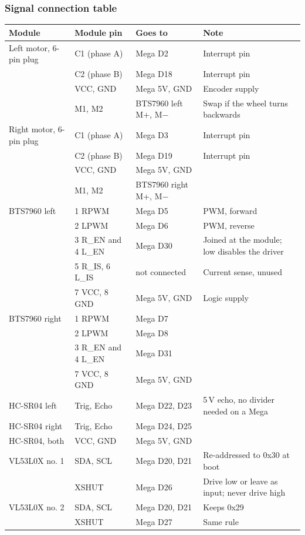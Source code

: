 \subsubsection*{Signal connection table}
{\small
\begin{longtable}{@{}P{37mm}P{27mm}P{38mm}P{50mm}@{}}
\toprule
\textbf{Module} & \textbf{Module pin} & \textbf{Goes to} & \textbf{Note}\\
\midrule\endhead
Left motor, 6-pin plug & C1 (phase A) & Mega D2 & Interrupt pin\\
 & C2 (phase B) & Mega D18 & Interrupt pin\\
 & VCC, GND & Mega 5V, GND & Encoder supply\\
 & M1, M2 & BTS7960 left M+, M$-$ & Swap if the wheel turns backwards\\
Right motor, 6-pin plug & C1 (phase A) & Mega D3 & Interrupt pin\\
 & C2 (phase B) & Mega D19 & Interrupt pin\\
 & VCC, GND & Mega 5V, GND & \\
 & M1, M2 & BTS7960 right M+, M$-$ & \\
BTS7960 left & 1 RPWM & Mega D5 & PWM, forward\\
 & 2 LPWM & Mega D6 & PWM, reverse\\
 & 3 R\_EN and 4 L\_EN & Mega D30 & Joined at the module; low disables the driver\\
 & 5 R\_IS, 6 L\_IS & not connected & Current sense, unused\\
 & 7 VCC, 8 GND & Mega 5V, GND & Logic supply\\
BTS7960 right & 1 RPWM & Mega D7 & \\
 & 2 LPWM & Mega D8 & \\
 & 3 R\_EN and 4 L\_EN & Mega D31 & \\
 & 7 VCC, 8 GND & Mega 5V, GND & \\
HC-SR04 left & Trig, Echo & Mega D22, D23 & 5\,V echo, no divider needed on a Mega\\
HC-SR04 right & Trig, Echo & Mega D24, D25 & \\
HC-SR04, both & VCC, GND & Mega 5V, GND & \\
VL53L0X no. 1 & SDA, SCL & Mega D20, D21 & Re-addressed to 0x30 at boot\\
 & XSHUT & Mega D26 & Drive low or leave as input; never drive high\\
VL53L0X no. 2 & SDA, SCL & Mega D20, D21 & Keeps 0x29\\
 & XSHUT & Mega D27 & Same rule\\

\end{longtable}}
